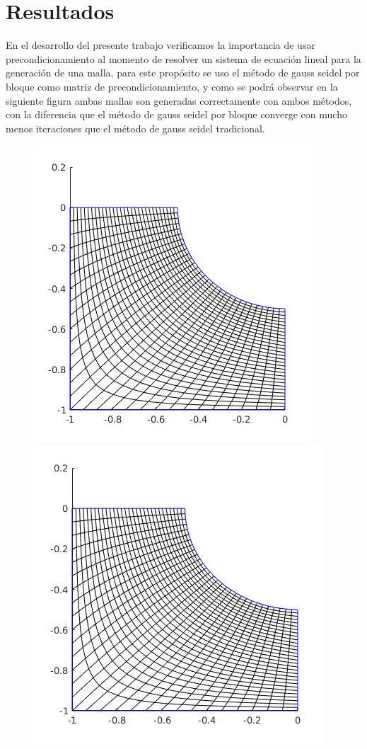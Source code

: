 \documentclass[11pt,letterpaper]{article}
\begin{document}
\section{Resultados}
En el desarrollo del presente trabajo verificamos la importancia de usar precondicionamiento al momento de resolver un sistema de ecuación lineal para la generación de una malla, para este propósito se uso el método de gauss seidel por bloque como matriz de precondicionamiento, y como se podrá observar en la siguiente figura ambas mallas son generadas correctamente con ambos métodos, con la diferencia que el método de gauss seidel por bloque converge con mucho menos iteraciones que el método de gauss seidel tradicional.

\begin{figure}[H]
	\begin{minipage}{.49\linewidth}
		\centering
		\includegraphics[scale=0.44]{./imgs/GSBloque.jpg}
	\end{minipage}
	\begin{minipage}{.49\linewidth}
		\centering
		\includegraphics[scale=0.44]{./imgs/GS.jpg}

\end{minipage}
\end{figure}
\end{document}
